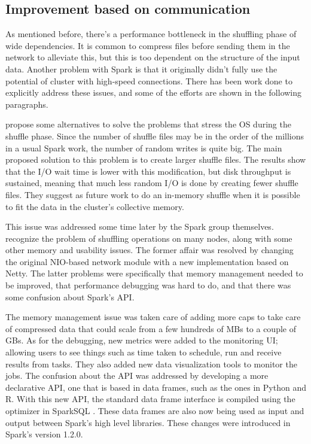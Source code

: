 \documentclass{article}
\begin{document}
\subsection{Improvement based on communication}

As mentioned before, there's a performance bottleneck in the shuffling phase of wide dependencies. It is common to compress files before sending them in the network to alleviate this, but this is too dependent on the structure of the input data. Another problem with Spark is that it originally didn't fully use the potential of cluster with high-speed connections. There has been work done to explicitly address these issues, and some of the efforts are shown in the following paragraphs.

\citeauthor{davidson2013optimizing} \cite{davidson2013optimizing} propose some alternatives to solve the problems that stress the OS during the shuffle phase. Since the number of shuffle files may be in the order of the millions in a usual Spark work, the number of random writes is quite big. The main proposed solution to this problem is to create larger shuffle files. The results show that the I/O wait time is lower with this modification, but disk throughput is sustained, meaning that much less random I/O is done by creating fewer shuffle files. They suggest as future work to do an in-memory shuffle when it is possible to fit the data in the cluster's collective memory.

This issue was addressed some time later by the Spark group themselves. \citeauthor{Armbrust2015} \cite{Armbrust2015} recognize the problem of shuffling operations on many nodes, along with some other memory and usability issues. The former affair was resolved by changing the original NIO-based network module with a new implementation based on Netty. The latter problems were specifically that memory management needed to be improved, that performance debugging was hard to do, and that there was some confusion about Spark's API.

The memory management issue was taken care of adding more caps to take care of compressed data that could scale from a few hundreds of MBs to a couple of GBs. As for the debugging, new metrics were added to the monitoring UI; allowing users to see things such as time taken to schedule, run and receive results from tasks. They also added new data visualization tools to monitor the jobs. The confusion about the API was addressed by developing a more declarative API, one that is based in data frames, such as the ones in Python and R. With this new API, the standard data frame interface is compiled using the optimizer in SparkSQL \cite{armbrust2015spark}. These data frames are also now being used as input and output between Spark's high level libraries. These changes were introduced in Spark's version 1.2.0.
\end{document}
